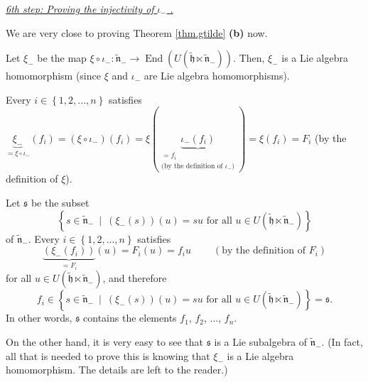 \documentclass[etingof-lie.tex]{subfiles}
\begin{document}
\bigskip

\underline{\textit{6th step: Proving the injectivity of }$\iota_{-}$%
\textit{.}}

We are very close to proving Theorem \ref{thm.gtilde} \textbf{(b)} now.

Let $\xi_{-}$ be the map $\xi\circ\iota_{-}:\widetilde{\mathfrak{n}}%
_{-}\rightarrow\operatorname*{End}\left(  U\left(  \widetilde{\mathfrak{h}%
}\ltimes\widetilde{\mathfrak{n}}_{-}\right)  \right)  $. Then, $\xi_{-}$ is a
Lie algebra homomorphism (since $\xi$ and $\iota_{-}$ are Lie algebra homomorphisms).

Every $i\in\left\{  1,2,...,n\right\}  $ satisfies $\underbrace{\xi_{-}}%
_{=\xi\circ\iota_{-}}\left(  f_{i}\right)  =\left(  \xi\circ\iota_{-}\right)
\left(  f_{i}\right)  =\xi\left(  \underbrace{\iota_{-}\left(  f_{i}\right)
}_{\substack{=f_{i}\\\text{(by the definition of }\iota_{-}\text{)}}}\right)
=\xi\left(  f_{i}\right)  =F_{i}$ (by the definition of $\xi$).

Let $\mathfrak{s}$ be the subset%
\[
\left\{  s\in\widetilde{\mathfrak{n}}_{-}\ \mid\ \left(  \xi_{-}\left(
s\right)  \right)  \left(  u\right)  =su\text{ for all }u\in U\left(
\widetilde{\mathfrak{h}}\ltimes\widetilde{\mathfrak{n}}_{-}\right)  \right\}
\]
of $\widetilde{\mathfrak{n}}_{-}$. Every $i\in\left\{  1,2,...,n\right\}  $
satisfies%
\[
\underbrace{\left(  \xi_{-}\left(  f_{i}\right)  \right)  }_{=F_{i}}\left(
u\right)  =F_{i}\left(  u\right)  =f_{i}u\ \ \ \ \ \ \ \ \ \ \left(  \text{by
the definition of }F_{i}\right)
\]
for all $u\in U\left(  \widetilde{\mathfrak{h}}\ltimes\widetilde{\mathfrak{n}%
}_{-}\right)  $, and therefore%
\[
f_{i}\in\left\{  s\in\widetilde{\mathfrak{n}}_{-}\ \mid\ \left(  \xi
_{-}\left(  s\right)  \right)  \left(  u\right)  =su\text{ for all }u\in
U\left(  \widetilde{\mathfrak{h}}\ltimes\widetilde{\mathfrak{n}}_{-}\right)
\right\}  =\mathfrak{s}.
\]
In other words, $\mathfrak{s}$ contains the elements $f_{1}$, $f_{2}$, $...$,
$f_{n}$.

\begin{vershort}
On the other hand, it is very easy to see that $\mathfrak{s}$ is a Lie
subalgebra of $\widetilde{\mathfrak{n}}_{-}$. (In fact, all that is needed to
prove this is knowing that $\xi_{-}$ is a Lie algebra homomorphism. The
details are left to the reader.)
\end{vershort}
\end{document}
